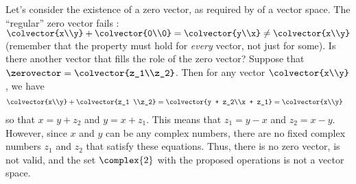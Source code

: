 %
Let's consider the existence of a zero vector, as required by  of a vector space.  The ``regular'' zero vector fails : $\colvector{x\\y}+\colvector{0\\0} = \colvector{y\\x}\ne\colvector{x\\y}$ (remember that the property must hold for {\it{every}} vector, not just for some).  Is there another vector that fills the role of the zero vector?  Suppose that $\zerovector=\colvector{z_1\\z_2}$.  Then for any vector $\colvector{x\\y}$, we have
%
\begin{align*}
\colvector{x\\y}+\colvector{z_1 \\z_2}
&= \colvector{y + z_2\\x + z_1} 
=  \colvector{x\\y}
\end{align*}
%
so that $x = y + z_2$ and $y = x + z_1$.  This means that $z_1 = y - x$ and $z_2 = x - y$.  However, since $x$ and $y$ can be any complex numbers, there are no fixed complex numbers $z_1$ and $z_2$ that satisfy these equations.  Thus, there is no zero vector,   is not valid, and the set  $\complex{2}$ with the proposed operations is not a vector space.